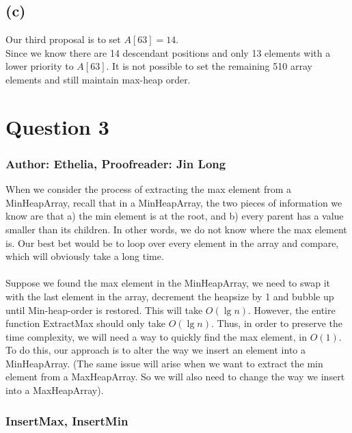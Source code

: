 \documentclass{article}
\begin{document}

\subsection*{(c)}
Our third proposal is to set $A[63] = 14$.\\
Since we know there are 14 descendant positions and only 13 elements with a lower priority to $A[63]$. It is not possible to set the remaining 510 array elements and still maintain max-heap order.

\newpage
\section*{Question 3}
\subsubsection*{Author: Ethelia, Proofreader: Jin Long}
When we consider the process of extracting the max element from a MinHeapArray, recall that in a MinHeapArray, the two pieces of information we know are that a) the min element is at the root, and b) every parent has a value smaller than its children. In other words, we do not know where the max element is. Our best bet would be to loop over every element in the array and compare, which will obviously take a long time. \\~\\
Suppose we found the max element in the MinHeapArray, we need to swap it with the last element in the array, decrement the heapsize by 1 and bubble up until Min-heap-order is restored. This will take $O(\lg n)$. However, the entire function ExtractMax should only take $O(\lg n)$. Thus, in order to preserve the time complexity, we will need a way to quickly find the max element, in $O(1)$. To do this, our approach is to alter the way we insert an element into a MinHeapArray. (The same issue will arise when we want to extract the min element from a MaxHeapArray. So we will also need to change the way we insert into a MaxHeapArray). 


\subsubsection*{InsertMax, InsertMin}
\end{document}
